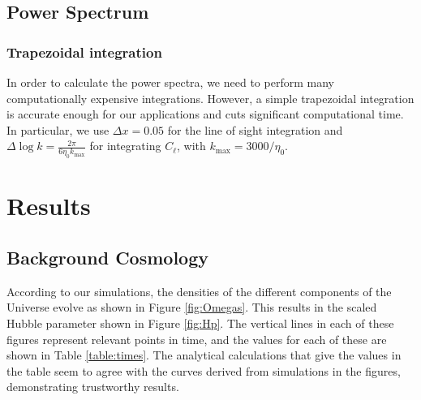 \documentclass{aa}
\begin{document}
\subsection{Power Spectrum}

\subsubsection{Trapezoidal integration}

In order to calculate the power spectra, we need to perform many computationally expensive integrations. However, a simple trapezoidal integration is accurate enough for our applications and cuts significant computational time. In particular, we use $\Delta x = 0.05$ for the line of sight integration and $\Delta \log k = \frac{2\pi}{6\eta_0 k_\text{max}}$ for integrating $C_\ell$, with $k_\text{max} = 3000 / \eta_0$.

\section{Results}

\subsection{Background Cosmology}

According to our simulations, the densities of the different components of the Universe evolve as shown in Figure \ref{fig:Omegas}. This results in the scaled Hubble parameter shown in Figure \ref{fig:Hp}. The vertical lines in each of these figures represent relevant points in time, and the values for each of these are shown in Table \ref{table:times}. The analytical calculations that give the values in the table seem to agree with the curves derived from simulations in the figures, demonstrating trustworthy results.
\end{document}
